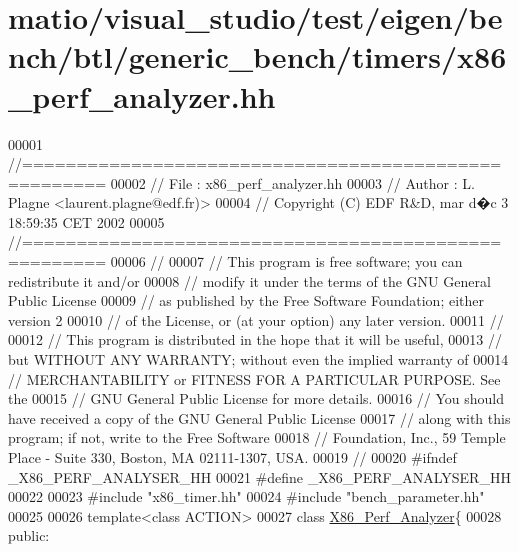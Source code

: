 \hypertarget{matio_2visual__studio_2test_2eigen_2bench_2btl_2generic__bench_2timers_2x86__perf__analyzer_8hh_source}{}\section{matio/visual\+\_\+studio/test/eigen/bench/btl/generic\+\_\+bench/timers/x86\+\_\+perf\+\_\+analyzer.hh}
\label{matio_2visual__studio_2test_2eigen_2bench_2btl_2generic__bench_2timers_2x86__perf__analyzer_8hh_source}

\begin{DoxyCode}
00001 \textcolor{comment}{//=====================================================}
00002 \textcolor{comment}{// File   :  x86\_perf\_analyzer.hh}
00003 \textcolor{comment}{// Author :  L. Plagne <laurent.plagne@edf.fr)>}
00004 \textcolor{comment}{// Copyright (C) EDF R&D,  mar d�c 3 18:59:35 CET 2002}
00005 \textcolor{comment}{//=====================================================}
00006 \textcolor{comment}{//}
00007 \textcolor{comment}{// This program is free software; you can redistribute it and/or}
00008 \textcolor{comment}{// modify it under the terms of the GNU General Public License}
00009 \textcolor{comment}{// as published by the Free Software Foundation; either version 2}
00010 \textcolor{comment}{// of the License, or (at your option) any later version.}
00011 \textcolor{comment}{//}
00012 \textcolor{comment}{// This program is distributed in the hope that it will be useful,}
00013 \textcolor{comment}{// but WITHOUT ANY WARRANTY; without even the implied warranty of}
00014 \textcolor{comment}{// MERCHANTABILITY or FITNESS FOR A PARTICULAR PURPOSE.  See the}
00015 \textcolor{comment}{// GNU General Public License for more details.}
00016 \textcolor{comment}{// You should have received a copy of the GNU General Public License}
00017 \textcolor{comment}{// along with this program; if not, write to the Free Software}
00018 \textcolor{comment}{// Foundation, Inc., 59 Temple Place - Suite 330, Boston, MA  02111-1307, USA.}
00019 \textcolor{comment}{//}
00020 \textcolor{preprocessor}{#ifndef \_X86\_PERF\_ANALYSER\_HH}
00021 \textcolor{preprocessor}{#define \_X86\_PERF\_ANALYSER\_HH}
00022 
00023 \textcolor{preprocessor}{#include "x86\_timer.hh"}
00024 \textcolor{preprocessor}{#include "bench\_parameter.hh"}
00025 
00026 \textcolor{keyword}{template}<\textcolor{keyword}{class} ACTION>
00027 \textcolor{keyword}{class }\hyperlink{class_x86___perf___analyzer}{X86\_Perf\_Analyzer}\{
00028 \textcolor{keyword}{public}:

\end{DoxyCode}
